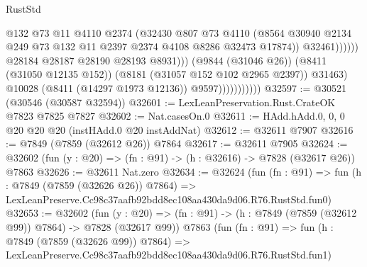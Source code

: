 \begin{lexlean}{RustStd}
\begin{coremodule}
                                              @132
                                              @73
                                              @11
                                              @4110
                                              @2374
                                              (@32430
                                                @807
                                                @73
                                                @4110
                                                (@8564
                                                  @30940
                                                  @2134
                                                  @249
                                                  @73
                                                  @132
                                                  @11
                                                  @2397
                                                  @2374
                                                  @4108
                                                  @8286
                                                  @32473
                                                  @17874))
                                              @32461))))))
                                  @28184
                                  @28187
                                  @28190
                                  @28193
                                  @8931)))
                            (@9844 (@31046 @26))
                            (@8411 (@31050 @12135 @152))
                            (@8181 (@31057 @152 @102 @2965 @2397))
                            @31463)
                          @10028
                          (@8411 (@14297 @1973 @12136))
                          @9597)))))))))))
@32597 := @30521 (@30546 (@30587 @32594))
@32601 := LexLeanPreservation.Rust.CrateOK @7823 @7825 @7827
@32602 := Nat.casesOn.{0}
@32611 := HAdd.hAdd.{0, 0, 0} @20 @20 @20 (instHAdd.{0} @20 instAddNat)
@32612 := @32611 @7907
@32616 := @7849 (@7859 (@32612 @26)) @7864
@32617 := @32611 @7905
@32624 := @32602 (fun (y : @20) => (fn : @91) -> (h : @32616) -> @7828 (@32617 @26)) @7863
@32626 := @32611 Nat.zero
@32634 := @32624
    (fun (fn : @91) =>
    fun (h : @7849 (@7859 (@32626 @26)) @7864) =>
    LexLeanPreserve.Cc98c37aafb92bdd8ec108aa430da9d06.R76.RustStd.fun0)
@32653 := @32602
    (fun (y : @20) => (fn : @91) -> (h : @7849 (@7859 (@32612 @99)) @7864) -> @7828 (@32617 @99))
    @7863
    (fun (fn : @91) =>
    fun (h : @7849 (@7859 (@32626 @99)) @7864) =>
    LexLeanPreserve.Cc98c37aafb92bdd8ec108aa430da9d06.R76.RustStd.fun1)

\end{coremodule}
\end{lexlean}
